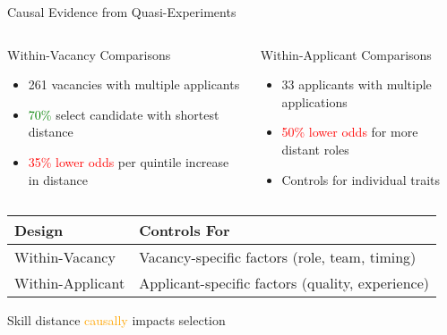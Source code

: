 \documentclass{beamer}
\begin{document}
\begin{frame}{Causal Evidence from Quasi-Experiments}
\begin{columns}
\begin{column}{0.48\textwidth}
\begin{block}{Within-Vacancy Comparisons}
\begin{itemize}
    \item 261 vacancies with multiple applicants
    \item \textcolor{green}{70\%} select candidate with shortest distance
    \item \textcolor{red}{35\% lower odds} per quintile increase in distance
\end{itemize}
\end{block}
\end{column}
\begin{column}{0.48\textwidth}
\begin{block}{Within-Applicant Comparisons}
\begin{itemize}
    \item 33 applicants with multiple applications
    \item \textcolor{red}{50\% lower odds} for more distant roles
    \item Controls for individual traits
\end{itemize}
\end{block}
\end{column}
\end{columns}

\vspace{0.3cm}
\begin{table}
\centering
\begin{tabular}{l l}
\toprule
\textbf{Design} & \textbf{Controls For} \\
\midrule
Within-Vacancy & Vacancy-specific factors (role, team, timing) \\
Within-Applicant & Applicant-specific factors (quality, experience) \\
\bottomrule
\end{tabular}
\end{table}

\vspace{0.2cm}
\begin{center}
\large Skill distance \textcolor{orange}{causally} impacts selection
\end{center}
\end{frame}
\end{document}

